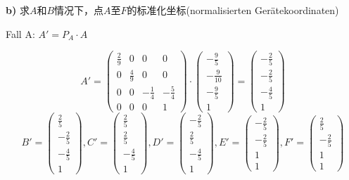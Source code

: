 \documentclass[fleqn]{article}
\begin{document}
\textbf{b)} 求$A$和$B$情况下，点$A$至$F$的标准化坐标(normalisierten Gerätekoordinaten)

Fall A: $A' = P_A \cdot A $

$$A' = 
\begin{pmatrix}
    \frac{2}{9} & 0 & 0 & 0 \\
    0 & \frac{4}{9} & 0 & 0 \\
    0 & 0 & -\frac{1}{4} & -\frac{5}{4} \\
    0 & 0 & 0 & 1
\end{pmatrix} \cdot
\begin{pmatrix}
    -\frac{9}{5} \\ -\frac{9}{10} \\ -\frac{9}{5} \\ 1  
\end{pmatrix} = 
\begin{pmatrix}
    -\frac{2}{5} \\ -\frac{2}{5} \\ -\frac{4}{5} \\ 1
\end{pmatrix} 
$$
$$
B' =
\begin{pmatrix}
    \frac{2}{5} \\ -\frac{2}{5} \\ -\frac{4}{5} \\ 1
\end{pmatrix}, 
C'=
\begin{pmatrix}
    \frac{2}{5} \\ \frac{2}{5} \\ -\frac{4}{5} \\ 1    
\end{pmatrix}, 
D'=
\begin{pmatrix}
    -\frac{2}{5} \\ \frac{2}{5} \\ -\frac{4}{5} \\ 1    
\end{pmatrix}, 
E'=
\begin{pmatrix}
    -\frac{2}{5} \\ -\frac{2}{5} \\ 1 \\ 1    
\end{pmatrix}, 
F'=
\begin{pmatrix}
    \frac{2}{5} \\ -\frac{2}{5} \\ 1 \\ 1    
\end{pmatrix}
$$
\end{document}
